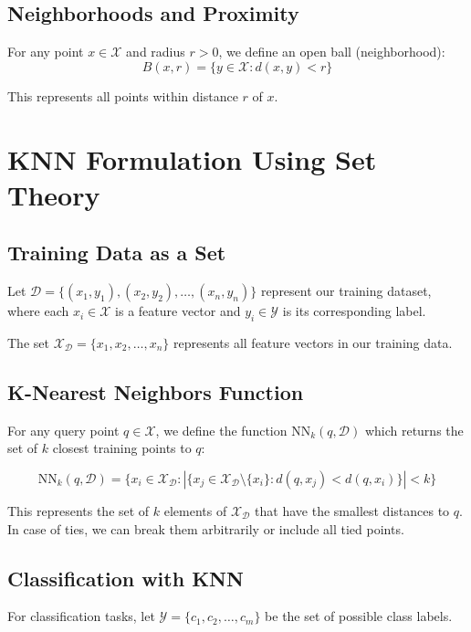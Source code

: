 \documentclass[12pt,a4paper]{article}
\begin{document}
\subsection{Neighborhoods and Proximity}
For any point $x \in \mathcal{X}$ and radius $r > 0$, we define an open ball (neighborhood):
\begin{equation}
B(x, r) = \{y \in \mathcal{X} : d(x, y) < r\}
\end{equation}

This represents all points within distance $r$ of $x$.

\section{KNN Formulation Using Set Theory}

\subsection{Training Data as a Set}
Let $\mathcal{D} = \{(x_1, y_1), (x_2, y_2), \ldots, (x_n, y_n)\}$ represent our training dataset, where each $x_i \in \mathcal{X}$ is a feature vector and $y_i \in \mathcal{Y}$ is its corresponding label.

The set $\mathcal{X}_{\mathcal{D}} = \{x_1, x_2, \ldots, x_n\}$ represents all feature vectors in our training data.

\subsection{K-Nearest Neighbors Function}
For any query point $q \in \mathcal{X}$, we define the function $\text{NN}_k(q, \mathcal{D})$ which returns the set of $k$ closest training points to $q$:

\begin{equation}
\text{NN}_k(q, \mathcal{D}) = \{x_i \in \mathcal{X}_{\mathcal{D}} : |\{x_j \in \mathcal{X}_{\mathcal{D}} \setminus \{x_i\} : d(q, x_j) < d(q, x_i)\}| < k\}
\end{equation}

This represents the set of $k$ elements of $\mathcal{X}_{\mathcal{D}}$ that have the smallest distances to $q$. In case of ties, we can break them arbitrarily or include all tied points.

\subsection{Classification with KNN}
For classification tasks, let $\mathcal{Y} = \{c_1, c_2, \ldots, c_m\}$ be the set of possible class labels.
\end{document}
